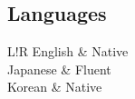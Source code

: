\documentclass[a4paper,11pt]{article}
\newcommand\VRule{\color{lightgray}\vrule width 0.5pt}
\begin{document}
	\subsection*{Languages}
	\begin{longtable}{L!{\VRule}R}
		English & Native\\
		Japanese & Fluent\\
		Korean & Native\\
	\end{longtable}




\end{document}
